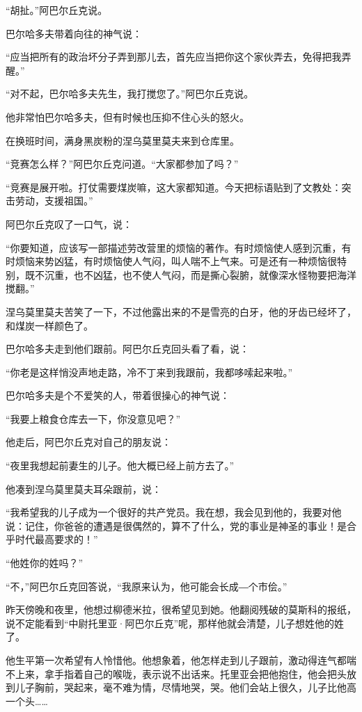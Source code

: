 “胡扯。”阿巴尔丘克说。

巴尔哈多夫带着向往的神气说：

“应当把所有的政治坏分子弄到那儿去，首先应当把你这个家伙弄去，免得把我弄醒。”

“对不起，巴尔哈多夫先生，我打搅您了。”阿巴尔丘克说。

他非常怕巴尔哈多夫，但有时候也压抑不住心头的怒火。

在换班时间，满身黑炭粉的涅乌莫里莫夫来到仓库里。

“竞赛怎么样？”阿巴尔丘克问道。“大家都参加了吗？”

“竞赛是展开啦。打仗需要煤炭嘛，这大家都知道。今天把标语贴到了文教处：突击劳动，支援祖国。”

阿巴尔丘克叹了一口气，说：

“你要知道，应该写一部描述劳改营里的烦恼的著作。有时烦恼使人感到沉重，有时烦恼来势凶猛，有时烦恼使人气闷，叫人喘不上气来。可是还有一种烦恼很特别，既不沉重，也不凶猛，也不使人气闷，而是撕心裂腑，就像深水怪物要把海洋搅翻。”

涅乌莫里莫夫苦笑了一下，不过他露出来的不是雪亮的白牙，他的牙齿已经坏了，和煤炭一样颜色了。

巴尔哈多夫走到他们跟前。阿巴尔丘克回头看了看，说：

“你老是这样悄没声地走路，冷不丁来到我跟前，我都哆嗦起来啦。”

巴尔哈多夫是个不爱笑的人，带着很操心的神气说：

“我要上粮食仓库去一下，你没意见吧？”

他走后，阿巴尔丘克对自己的朋友说：

“夜里我想起前妻生的儿子。他大概已经上前方去了。”

他凑到涅乌莫里莫夫耳朵跟前，说：

“我希望我的儿子成为一个很好的共产党员。我在想，我会见到他的，我要对他说：记住，你爸爸的遭遇是很偶然的，算不了什么，党的事业是神圣的事业！是合乎时代最高要求的！”

“他姓你的姓吗？”

“不，”阿巴尔丘克回答说，“我原来认为，他可能会长成―个市侩。”

昨天傍晚和夜里，他想过柳德米拉，很希望见到她。他翻阅残破的莫斯科的报纸，说不定能看到“中尉托里亚·阿巴尔丘克”呢，那样他就会清楚，儿子想姓他的姓了。

他生平第一次希望有人怜惜他。他想象着，他怎样走到儿子跟前，激动得连气都喘不上来，拿手指着自己的喉咙，表示说不出话来。托里亚会把他抱住，他会把头放到儿子胸前，哭起来，毫不难为情，尽情地哭，哭。他们会站上很久，儿子比他高一个头……

